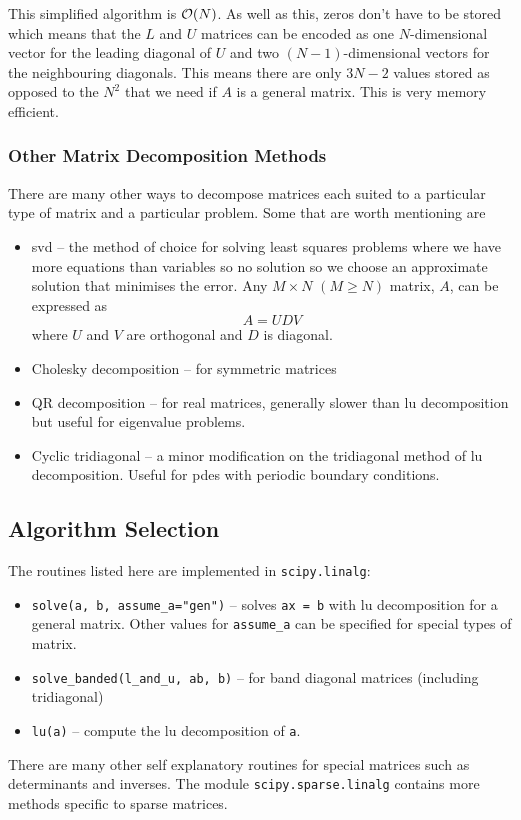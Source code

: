 \documentclass[a4paper]{article}
\begin{document}
    This simplified algorithm is \(\order{N}\).
    As well as this, zeros don't have to be stored which means that the \(L\) and \(U\) matrices can be encoded as one \(N\)-dimensional vector for the leading diagonal of \(U\) and two \((N-1)\)-dimensional vectors for the neighbouring diagonals.
    This means there are only \(3N - 2\) values stored as opposed to the \(N^2\) that we need if \(A\) is a general matrix.
    This is very memory efficient.
    
    \subsubsection{Other Matrix Decomposition Methods}
    There are many other ways to decompose matrices each suited to a particular type of matrix and a particular problem.
    Some that are worth mentioning are
    \begin{itemize}
        \item \gls{svd} -- the method of choice for solving least squares problems where we have more equations than variables so no solution so we choose an approximate solution that minimises the error.
        Any \(M\times N\) \((M \ge N)\) matrix, \(A\), can be expressed as
        \[A = UDV\]
        where \(U\) and \(V\) are orthogonal and \(D\) is diagonal.
        
        \item Cholesky decomposition -- for symmetric matrices
        
        \item QR decomposition -- for real matrices, generally slower than \gls{lu} decomposition but useful for eigenvalue problems.
        
        \item Cyclic tridiagonal -- a minor modification on the tridiagonal method of \gls{lu} decomposition.
        Useful for \glspl{pde} with periodic boundary conditions.
    \end{itemize}
    
    \subsection{Algorithm Selection}
    The routines listed here are implemented in \lstinline|scipy.linalg|:
    \begin{itemize}
        \item \lstinline|solve(a, b, assume_a="gen")| -- solves \lstinline|ax = b| with \gls{lu} decomposition for a general matrix.
        Other values for \lstinline|assume_a| can be specified for special types of matrix.
        \item \lstinline|solve_banded(l_and_u, ab, b)| -- for band diagonal matrices (including tridiagonal)
        
        \item \lstinline|lu(a)| -- compute the \gls{lu} decomposition of \lstinline|a|.
    \end{itemize}
    There are many other self explanatory routines for special matrices such as determinants and inverses.
    The module \lstinline|scipy.sparse.linalg| contains more methods specific to sparse matrices.
    
\end{document}

